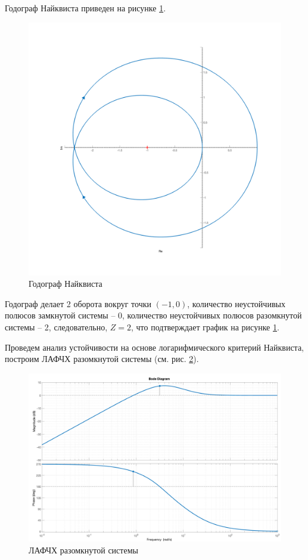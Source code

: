 Годограф Найквиста приведен на рисунке \ref{fig:task2_nyquist}.
\begin{figure}[ht!]
    \centering
    \includegraphics[width=\textwidth]{media/plots/task2_nyquist_open.png}
    \caption{Годограф Найквиста}
    \label{fig:task2_nyquist}
\end{figure}
Годограф делает 2 оборота вокруг точки $(-1, 0)$, количество неустойчивых полюсов замкнутой системы -- 0,
количество неустойчивых полюсов разомкнутой системы -- 2, следовательно, $Z = 2$, что подтверждает график на рисунке \ref{fig:task2_nyquist}.

Проведем анализ устойчивости на основе логарифмического критерий Найквиста, построим ЛАФЧХ разомкнутой системы (см. рис. \ref{fig:task2_bode_open}).
\begin{figure}[ht!]
    \centering
    \includegraphics[width=\textwidth]{media/plots/task2_bode_open.png}
    \caption{ЛАФЧХ разомкнутой системы}
    \label{fig:task2_bode_open}
\end{figure}

